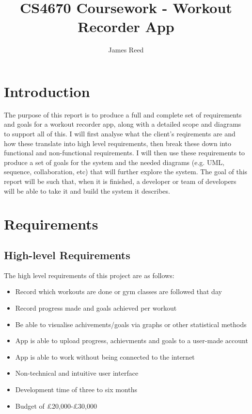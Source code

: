 \documentclass{article}
\begin{document}
\title{CS4670 Coursework - Workout Recorder App}
\author{James Reed}
\maketitle
\newpage
\tableofcontents

\newpage
\renewcommand\thesection{\arabic{section}}

\section{Introduction}

The purpose of this report is to produce a full and complete set of requirements and goals for a workout recorder app, along with a detailed scope and diagrams to support all of this. I will first analyse what the client's reqirements are and how these translate into high level requirements, then break these down into functional and non-functional requirements. I will then use these requirements to produce a set of goals for the system and the needed diagrams (e.g. UML, sequence, collaboration, etc) that will further explore the system. The goal of this report will be such that, when it is finished, a developer or team of developers will be able to take it and build the system it describes.

\section{Requirements}

\subsection{High-level Requirements}

The high level requirements of this project are as follows:

\begin{itemize}

\item Record which workouts are done or gym classes are followed that day
\item Record progress made and goals achieved per workout
\item Be able to visualise achivements/goals via graphs or other statistical methods
\item App is able to upload progress, achievments and goals to a user-made account
\item App is able to work without being connected to the internet
\item Non-technical and intuitive user interface
\item Development time of three to six months
\item Budget of \pounds20,000-\pounds30,000

\end{itemize}
\end{document}
